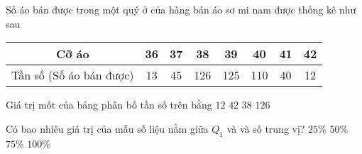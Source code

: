 \begin{ex}%
	Số áo bán được trong một quý ở của hàng bán áo sơ mi nam được thống kê như sau 
	\begin{center}
		\begin{tabular}{|c|c|c|c|c|c|c|c|}
			\hline Cỡ áo & 36 & 37 & 38 & 39 & 40 & 41 & 42 \\
			\hline Tần số (Số áo bán được) & 13 & 45 & 126 & 125 & 110 & 40 & 12 \\
			\hline
		\end{tabular}
	\end{center}
	Giá trị mốt của bảng phân bố tần số trên bằng
	\choice
	{$12$}
	{$42$}
	{\True $38$}
	{$126$}
\end{ex}

\begin{ex}%
Có bao nhiêu giá trị của mẫu số liệu nằm giữa $Q_1$ và và số trung vị?
\choice
{\True $25\%$}
{$50\%$}
{$75\%$}
{$100\%$}
\end{ex}

